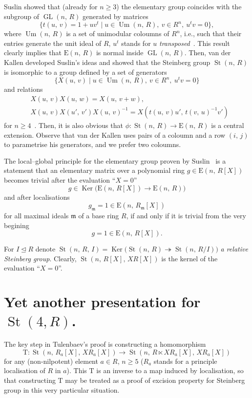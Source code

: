 \documentclass[11pt]{amsart}
\theoremstyle{plain} \declaretheorem[name=Theorem, Refname={Theorem,Theorems}]{tm} \Crefname{tm}{Theorem}{Theorems}
\numberwithin{equation}{section}
\theoremstyle{definition} \newtheorem{df}[lm]{Definition} \Crefname{df}{Definition}{Definitions}
\theoremstyle{remark} \newtheorem{rk}[lm]{Remark} \Crefname{rk}{Remark}{Remarks}
\newcommand{\Ker}{\mathop{\mathrm{Ker}}\nolimits}
\newcommand{\E}{{\mathrm{E}}}
\newcommand{\Um}{\mathop{\mathrm{Um}}\nolimits}
\newcommand{\St}{\mathop{\mathrm{St}}\nolimits}
\newcommand{\GL}{\mathop{\mathrm{GL}}\nolimits}
\newcommand{\epi}{\twoheadrightarrow}
\newcommand{\inv}{^{-1}}
\begin{document}
Suslin showed that (already for $n\geq3$) the elementary group coincides with the subgroup of $\GL(n,\,R)$ generated by matrices
$$\{t(u,\,v)=1+uv^t\mid u\in\Um(n,\,R),\ v\in R^n,\ u^tv=0\},$$
where $\Um(n,\,R)$ is a set of unimodular coloumns of $R^n$, i.e., such that their entries generate the unit ideal of $R$, $u^t$ stands for $u$ {\it transposed}~\cite{Sus}.
This result clearly implies that $\E(n,\,R)$ is normal inside $\GL(n,\,R)$.
Then, van der Kallen developed Suslin's ideas and showed that the Steinberg group $\St(n,\,R)$ is isomorphic to a group defined by a set of generators
$$\{X(u,\,v)\mid u\in\Um(n,\,R),\ v\in R^n,\ u^tv=0\}$$ and relations
\setcounter{equation}{0} \renewcommand{\theequation}{K\arabic{equation}}
\begin{align}
&X(u,\,v)X(u,\,w)=X(u,\,v+w),\\
&X(u,\,v)X(u',\,v')X(u,\,v)\inv=X(t(u,\,v)u',\,t(v,\,u)\inv v')
\end{align}
for $n\geq4$~\cite{vdK}.
Then, it is also obvious that $\phi\colon\St(n,\,R)\rightarrow\E(n,\,R)$ is a central extension.
Observe that van der Kallen uses pairs of a coloumn and a row $(i,\,j)$ to parametrise his generators, and we prefer two coloumns.

The local--global principle for the elementary group proven by Suslin~\cite{Sus} is a statement that an elementary matrix over a polynomial ring $g\in\E(n,\,R[X])$ becomes trivial after the evaluation ``$X=0$''
$$
g\in\Ker\big(\E(n,\,R[X])\rightarrow\E(n,\,R)\big)
$$
and after localisations
$$
g_{\mathfrak m}=1\in\E(n,\,R_{\mathfrak m}[X])
$$
for all maximal ideals $\mathfrak m$ of a base ring $R$, if and only if it is trivial from the very begining
$$
g=1\in\E(n,\,R[X]).
$$

For $I\trianglelefteq R$ denote $\St(n,\,R,\,I)=\Ker\big(\St(n,\,R)\epi\St(n,\,R/I)\big)$ {\it a relative Steinberg group}. Clearly, $\St(n,\,R[X],\,XR[X])$ is the kernel of the evaluation ``$X=0$''.

\section{Yet another presentation for $\St(4, R)$.}

The key step in Tulenbaev's proof is constructing a homomorphism
$$
\mathrm T\colon\St(n,\,R_a[X],\,XR_a[X])\rightarrow\St(n,\,R\ltimes XR_a[X],\,XR_a[X])
$$
for any (non-nilpotent) element $a\in R$, $n\geq5$ ($R_a$ stands for a principle localisation of $R$ in $a$). This $\mathrm T$ is an inverse to a map induced by localisation, so that constructing $\mathrm T$ may be treated as a proof of excision property for Steinberg group in this very particular situation.
\end{document}
